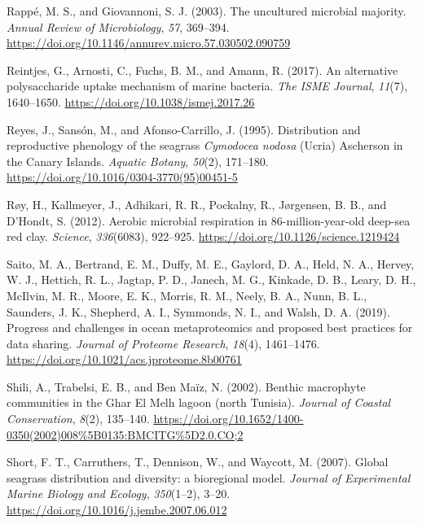 \documentclass[
  12 pt,
]{book}
\newlength{\cslhangindent}
\newlength{\cslentryspacingunit} %
\newenvironment{CSLReferences}[2] %
 {%
  \setlength{\parindent}{0pt}
  \ifodd #1
  \let\oldpar\par
  \def\par{\hangindent=\cslhangindent\oldpar}
  \fi
  \setlength{\parskip}{#2\cslentryspacingunit}
 }%
 {}
\begin{document}
\begin{CSLReferences}{1}{0}
\leavevmode{}%
Rappé, M. S., and Giovannoni, S. J. (2003). The uncultured microbial majority. \emph{Annual Review of Microbiology}, \emph{57}, 369--394. \url{https://doi.org/10.1146/annurev.micro.57.030502.090759}

\leavevmode{}%
Reintjes, G., Arnosti, C., Fuchs, B. M., and Amann, R. (2017). An alternative polysaccharide uptake mechanism of marine bacteria. \emph{The ISME Journal}, \emph{11}(7), 1640--1650. \url{https://doi.org/10.1038/ismej.2017.26}

\leavevmode{}%
Reyes, J., Sansón, M., and Afonso-Carrillo, J. (1995). Distribution and reproductive phenology of the seagrass {{{\emph{Cymodocea nodosa}}} (Ucria) Ascherson in the Canary Islands}. \emph{Aquatic Botany}, \emph{50}(2), 171--180. \url{https://doi.org/10.1016/0304-3770(95)00451-5}

\leavevmode{}%
Røy, H., Kallmeyer, J., Adhikari, R. R., Pockalny, R., Jørgensen, B. B., and D'Hondt, S. (2012). Aerobic microbial respiration in 86-million-year-old deep-sea red clay. \emph{Science}, \emph{336}(6083), 922--925. \url{https://doi.org/10.1126/science.1219424}

\leavevmode{}%
Saito, M. A., Bertrand, E. M., Duffy, M. E., Gaylord, D. A., Held, N. A., Hervey, W. J., Hettich, R. L., Jagtap, P. D., Janech, M. G., Kinkade, D. B., Leary, D. H., McIlvin, M. R., Moore, E. K., Morris, R. M., Neely, B. A., Nunn, B. L., Saunders, J. K., Shepherd, A. I., Symmonds, N. I., and Walsh, D. A. (2019). Progress and challenges in ocean metaproteomics and proposed best practices for data sharing. \emph{Journal of Proteome Research}, \emph{18}(4), 1461--1476. \url{https://doi.org/10.1021/acs.jproteome.8b00761}

\leavevmode{}%
Shili, A., Trabelsi, E. B., and Ben Maïz, N. (2002). Benthic macrophyte communities in the {Ghar El Melh} lagoon (north {Tunisia}). \emph{Journal of Coastal Conservation}, \emph{8}(2), 135--140. \url{https://doi.org/10.1652/1400-0350(2002)008\%5B0135:BMCITG\%5D2.0.CO;2}

\leavevmode{}%
Short, F. T., Carruthers, T., Dennison, W., and Waycott, M. (2007). Global seagrass distribution and diversity: a bioregional model. \emph{Journal of Experimental Marine Biology and Ecology}, \emph{350}(1--2), 3--20. \url{https://doi.org/10.1016/j.jembe.2007.06.012}


\end{CSLReferences}
\end{document}
